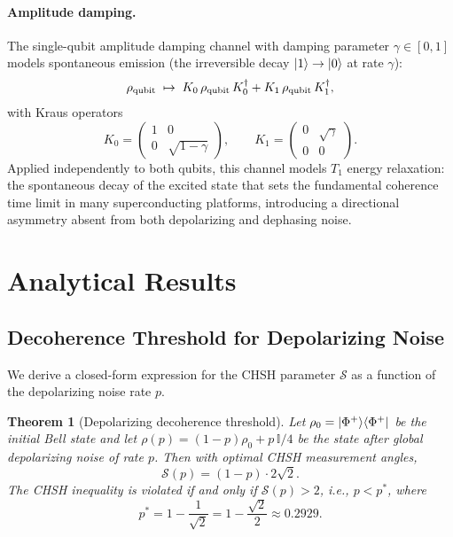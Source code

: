 \documentclass[12pt]{article}
\newtheorem{theorem}{Theorem}
\newcommand{\Phiplus}{\ket{\Phi^+}}
\newcommand{\pstar}{p^*}
\newcommand{\bigS}{\mathcal{S}}
\newcommand{\Id}{\mathbb{I}}
\begin{document}
\paragraph{Amplitude damping.}
The single-qubit amplitude damping channel with damping parameter $\gamma \in [0,1]$ models
spontaneous emission (the irreversible decay $\ket{1} \to \ket{0}$ at rate $\gamma$):
\begin{align}
  \rho_{\rm qubit} \;\mapsto\; K_0\,\rho_{\rm qubit}\,K_0^\dagger + K_1\,\rho_{\rm qubit}\,K_1^\dagger,
  \label{eq:amp_damp_channel}
\end{align}
with Kraus operators
\begin{equation}
  K_0 = \begin{pmatrix} 1 & 0 \\ 0 & \sqrt{1-\gamma} \end{pmatrix},\qquad
  K_1 = \begin{pmatrix} 0 & \sqrt{\gamma} \\ 0 & 0 \end{pmatrix}.
  \label{eq:kraus_amp_damp}
\end{equation}
Applied independently to both qubits, this channel models $T_1$ energy relaxation: the
spontaneous decay of the excited state that sets the fundamental coherence time limit
in many superconducting platforms, introducing a directional asymmetry absent from both
depolarizing and dephasing noise.

\section{Analytical Results}
\label{sec:analytical}

\subsection{Decoherence Threshold for Depolarizing Noise}
\label{subsec:threshold_depol}

We derive a closed-form expression for the CHSH parameter $\bigS$ as a function of the
depolarizing noise rate $p$.

\begin{theorem}[Depolarizing decoherence threshold]
\label{thm:depol}
Let $\rho_0 = \Phiplus\!\bra{\Phi^+}$ be the initial Bell state and let
$\rho(p) = (1-p)\rho_0 + p\,\Id/4$ be the state after global depolarizing noise of rate $p$.
Then with optimal CHSH measurement angles,
\begin{equation}
  \bigS(p) = (1-p)\cdot 2\sqrt{2}.
  \label{eq:S_depol}
\end{equation}
The CHSH inequality is violated if and only if $\bigS(p) > 2$, i.e., $p < \pstar$, where
\begin{equation}
  \pstar = 1 - \frac{1}{\sqrt{2}} = 1 - \frac{\sqrt{2}}{2} \approx 0.2929.
  \label{eq:pstar}
\end{equation}
\end{theorem}
\end{document}

